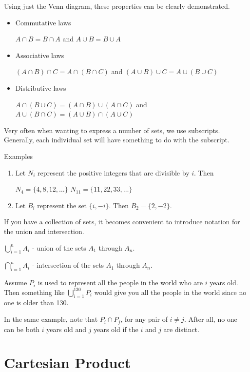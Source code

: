 \documentclass[12pt]{article}
\begin{document}
Using just the Venn diagram, these properties can be clearly demonstrated.

\begin{itemize}
\item Commutative laws

$A \cap B = B \cap A$ and $A \cup B = B \cup A$

\item Associative laws

$(A \cap B) \cap C = A \cap (B \cap C)$ and $(A \cup B) \cup C = A \cup (B \cup C)$

\item Distributive laws

$A \cap (B \cup C) = (A \cap B) \cup (A \cap C)$ and $A \cup (B \cap C) = (A \cup B) \cap (A \cup C)$
\end{itemize}

Very often when wanting to express a number of sets, we use subscripts. 
Generally, each individual set will have something to do with the subscript.

Examples

\begin{enumerate}
\item Let $N_i$ represent the positive integers that are divisible by $i$. Then

$N_4 = \{4,8,12,\ldots\}$
$N_{11} = \{11, 22, 33, \ldots\}$

\item Let $B_i$ represent the set $\{i,-i\}$. Then $B_2 = \{2,-2\}$.
\end{enumerate}

If you have a collection of sets, it becomes convenient to introduce notation for the union and intersection.

$\displaystyle \bigcup_{i=1}^n A_i$ - union of the sets $A_1$ through $A_n$.

$\displaystyle \bigcap_{i=1}^n A_i$ - intersection of the sets $A_1$ through $A_n$.

Assume $P_i$ is used to represent all the people in the world who are $i$ years old. 
Then something like $\displaystyle \bigcup_{i=1}^{130} P_i$ would give you all the people in the world since no one is older than 130. 

In the same example, note that $P_i \cap P_j$, for any pair of $i \neq j$. After all, no one can be both $i$ years old and $j$ years old if the $i$ and $j$ are distinct.

\section*{Cartesian Product}
\end{document}
